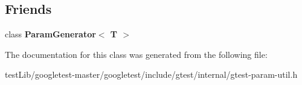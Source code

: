 \subsection*{Friends}
\begin{DoxyCompactItemize}
\item 
\mbox{\label{classtesting_1_1internal_1_1ParamIterator_ab73a355ae191f2f7eab54b65ca557714}} 
class {\bfseries Param\+Generator$<$ T $>$}
\end{DoxyCompactItemize}


The documentation for this class was generated from the following file\+:\begin{DoxyCompactItemize}
\item 
test\+Lib/googletest-\/master/googletest/include/gtest/internal/gtest-\/param-\/util.\+h\end{DoxyCompactItemize}
